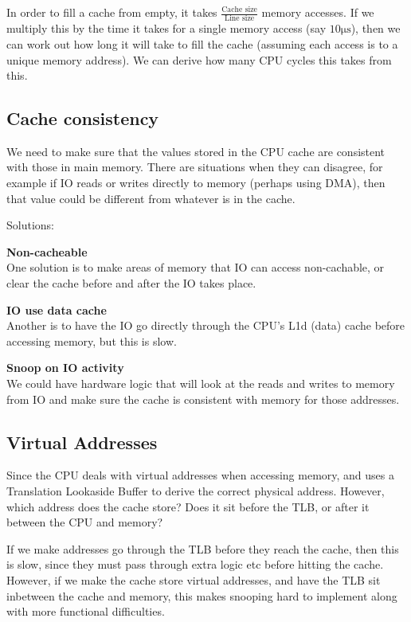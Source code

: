 In order to fill a cache from empty, it takes $\frac{\text{Cache
size}}{\text{Line size}}$ memory accesses. If we multiply this by the time it
takes for a single memory access (say $10\si{\micro\second}$), then we can work
out how long it will take to fill the cache (assuming each access is to a unique
memory address). We can derive how many CPU cycles this takes from this.

\subsection{Cache consistency}

We need to make sure that the values stored in the CPU cache are consistent with
those in main memory. There are situations when they can disagree, for example
if IO reads or writes directly to memory (perhaps using DMA), then that value
could be different from whatever is in the cache.

Solutions:
\begin{description}
  \item \textbf{Non-cacheable}\\
    One solution is to make areas of memory that IO can access non-cachable, or
    clear the cache before and after the IO takes place.
  \item \textbf{IO use data cache}\\
    Another is to have the IO go directly through the CPU's L1d (data) cache
    before accessing memory, but this is slow.
  \item \textbf{Snoop on IO activity}\\
    We could have hardware logic that will look at the reads and writes to
    memory from IO and make sure the cache is consistent with memory for those
    addresses.
\end{description}

\subsection{Virtual Addresses}

Since the CPU deals with virtual addresses when accessing memory, and uses a
Translation Lookaside Buffer to derive the correct physical address. However,
which address does the cache store? Does it sit before the TLB, or after it
between the CPU and memory?

If we make addresses go through the TLB before they reach the cache, then this
is slow, since they must pass through extra logic etc before hitting the cache.
However, if we make the cache store virtual addresses, and have the TLB sit
inbetween the cache and memory, this makes snooping hard to implement along with
more functional difficulties.


